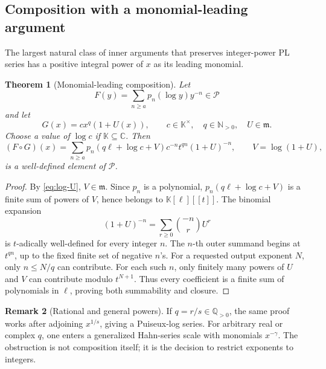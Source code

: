 \documentclass[11pt,oneside]{article}
\numberwithin{equation}{section}
\newtheorem{theorem}{Theorem}[section]
\theoremstyle{definition}
\newtheorem{remark}[theorem]{Remark}
\newcommand{\K}{\mathbb K}
\newcommand{\Q}{\mathbb Q}
\newcommand{\C}{\mathbb C}
\newcommand{\N}{\mathbb N}
\newcommand{\PL}{\mathscr P}
\begin{document}
\subsection{Composition with a monomial-leading argument}

The largest natural class of inner arguments that preserves integer-power PL
series has a positive integral power of \(x\) as its leading monomial.

\begin{theorem}[Monomial-leading composition]\label{thm:monomial-composition}
Let
\begin{equation}\label{eq:outer-inner-composition}
  F(y)=\sum_{n\ge a}p_n(\log y)y^{-n}\in\PL
\end{equation}
and let
\begin{equation}\label{eq:admissible-G}
  G(x)=c x^q(1+U(x)),
  \qquad c\in\K^\times,\quad q\in\N_{>0},\quad U\in\mathfrak m.
\end{equation}
Choose a value of \(\log c\) if \(\K\subseteq\C\).  Then
\begin{equation}\label{eq:composition-master}
\boxed{
  (F\circ G)(x)=
  \sum_{n\ge a}
  p_n\!\left(q\ell+\log c+V\right)
  c^{-n}t^{qn}(1+U)^{-n},
  \qquad V=\log(1+U),
}
\end{equation}
is a well-defined element of \(\PL\).
\end{theorem}

\begin{proof}
By \eqref{eq:log-U}, \(V\in\mathfrak m\).  Since \(p_n\) is a polynomial,
\(p_n(q\ell+\log c+V)\) is a finite sum of powers of \(V\), hence belongs to
\(\K[\ell][[t]]\).  The binomial expansion
\[
  (1+U)^{-n}=\sum_{r\ge0}\binom{-n}{r}U^r
\]
is \(t\)-adically well-defined for every integer \(n\).  The \(n\)-th outer
summand begins at \(t^{qn}\), up to the fixed finite set of negative \(n\)'s.
For a requested output exponent \(N\), only \(n\le N/q\) can contribute.  For
each such \(n\), only finitely many powers of \(U\) and \(V\) can contribute
modulo \(t^{N+1}\).  Thus every coefficient is a finite sum of polynomials in
\(\ell\), proving both summability and closure.
\end{proof}

\begin{remark}[Rational and general powers]
If \(q=r/s\in\Q_{>0}\), the same proof works after adjoining
\(x^{1/s}\), giving a Puiseux-log series.  For arbitrary real or complex \(q\),
one enters a generalized Hahn-series scale with monomials \(x^{-\gamma}\).
The obstruction is not composition itself; it is the decision to restrict
exponents to integers.
\end{remark}
\end{document}
